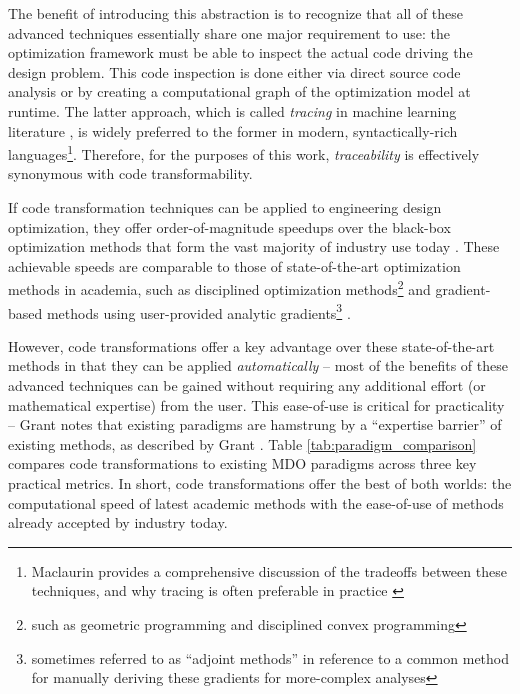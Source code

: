 \documentclass[12pt,vi,oneside]{report}
\begin{document}
    The benefit of introducing this abstraction is to recognize that all of these advanced techniques essentially share one major requirement to use: the optimization framework must be able to inspect the actual code driving the design problem. This code inspection is done either via direct source code analysis or by creating a computational graph of the optimization model at runtime. The latter approach, which is called \textit{tracing} in machine learning literature \cite{jax, frostig_compiling_2018, baydin_automatic_2018}, is widely preferred to the former in modern, syntactically-rich languages\footnote{Maclaurin provides a comprehensive discussion of the tradeoffs between these techniques, and why tracing is often preferable in practice \cite{maclaurin_modeling_2016}}. Therefore, for the purposes of this work, \textit{traceability} is effectively synonymous with code transformability.

    If code transformation techniques can be applied to engineering design optimization, they offer order-of-magnitude speedups over the black-box optimization methods that form the vast majority of industry use today \cite{martins_engineering_2021, lavin_simulation_2022}. These achievable speeds are comparable to those of state-of-the-art optimization methods in academia, such as disciplined optimization methods\footnote{such as geometric programming and disciplined convex programming} \cite{grant_disciplined_2006, gpkit, boyd_convex_2004, agrawal_disciplined_2019} and gradient-based methods using user-provided analytic gradients\footnote{sometimes referred to as ``adjoint methods'' in reference to a common method for manually deriving these gradients for more-complex analyses} \cite{gray_openmdao_2019, kenway_effective_2019, innes_don_2019}.

    However, code transformations offer a key advantage over these state-of-the-art methods in that they can be applied \textit{automatically} -- most of the benefits of these advanced techniques can be gained without requiring any additional effort (or mathematical expertise) from the user. This ease-of-use is critical for practicality -- Grant notes that existing paradigms are hamstrung by a ``expertise barrier'' of existing methods, as described by Grant \cite{grant_disciplined_2006}. Table \ref{tab:paradigm_comparison} compares code transformations to existing MDO paradigms across three key practical metrics. In short, code transformations offer the best of both worlds: the computational speed of latest academic methods with the ease-of-use of methods already accepted by industry today.
\end{document}
